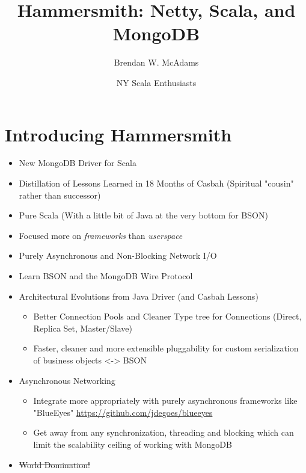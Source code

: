 \documentclass[xcolor=dvipsnames]{beamer}
\title{Hammersmith: Netty, Scala, and MongoDB} %
\institute[10gen, Inc.]{10gen, Inc.}
\author[B.W. McAdams]{Brendan W. McAdams}
\date{NY Scala Enthusiasts}
\newenvironment{itemizeframe}
               {\begin{frame}\startitemizeframe} 
               {\stopitemizeframe\end{frame}}
\newcommand\startitemizeframe{\begin{itemize}} \newcommand\stopitemizeframe{\end{itemize}}
\begin{document}
\begin{frame}
  \titlepage
\end{frame}

\section{Introducing Hammersmith}

\begin{itemizeframe}
    \frametitle{What is Hammersmith?}
    \framesubtitle{Overview}
    \item New MongoDB Driver for Scala 
    \item Distillation of Lessons Learned in 18 Months of Casbah (Spiritual "cousin" rather than successor)
    \item Pure Scala (With a little bit of Java at the very bottom for BSON)
    \item Focused more on \textit{frameworks} than \textit{userspace}
    \item Purely Asynchronous and Non-Blocking Network I/O
\end{itemizeframe}

\begin{itemizeframe}
    \frametitle{What is Hammersmith?}
    \framesubtitle{What Problems Does It Solve/Explore?}
    \item Learn BSON and the MongoDB Wire Protocol
    \item Architectural Evolutions from Java Driver (and Casbah Lessons)
        \begin{itemize} 
            \item Better Connection Pools and Cleaner Type tree for Connections (Direct, Replica Set, Master/Slave)
            \item Faster, cleaner and more extensible pluggability for custom serialization of business objects <-> BSON
        \end{itemize}
    \item Asynchronous Networking
        \begin{itemize}
            \item Integrate more appropriately with purely asynchronous frameworks like "BlueEyes" \url{https://github.com/jdegoes/blueeyes}
            \item Get away from any synchronization, threading and blocking which can limit the scalability ceiling of working with MongoDB
        \end{itemize}
    \item \sout{World Domination!}
\end{itemizeframe}
\end{document}
